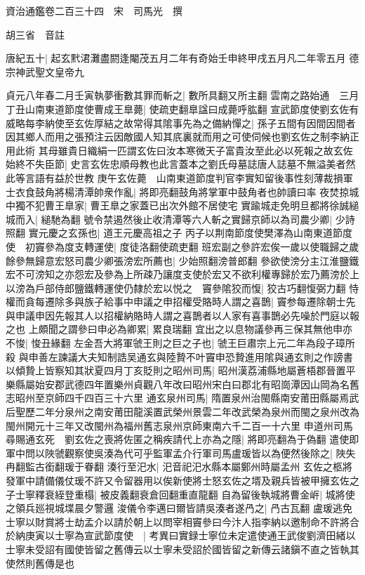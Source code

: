 資治通鑑卷二百三十四　宋　司馬光　撰

胡三省　音註

唐紀五十|{
	起玄黓涒灘盡閼逢閹茂五月二年有奇始壬申終甲戌五月凡二年零五月}
德宗神武聖文皇帝九

貞元八年春二月壬寅執夢衝數其罪而斬之|{
	數所具翻又所主翻}
雲南之路始通　三月丁丑山南東道節度使曹成王臯薨|{
	使疏吏翻臯諡曰成薨呼肱翻}
宣武節度使劉玄佐有威略每李納使至玄佐厚結之故常得其隂事先為之備納憚之|{
	孫子五間有因間因間者因其鄉人而用之張預注云因敵國人知其㡳裏就而用之可使伺候也劉玄佐之制李納正用此術}
其母雖貴日織絹一匹謂玄佐曰汝本寒微天子富貴汝至此必以死報之故玄佐始終不失臣節|{
	史言玄佐忠順母教也此言蓋本之劉氏母墓誌唐人誌墓不無溢美者然此等言語有益於世教}
庚午玄佐薨　山南東道節度判官李實知留後事性刻薄裁損軍士衣食鼓角將楊清潭帥衆作亂|{
	將即亮翻鼓角將掌軍中鼓角者也帥讀曰率}
夜焚掠城中獨不犯曹王臯家|{
	曹王臯之家蓋已出次外館不居使宅}
實踰城走免明旦都將徐誠縋城而入|{
	縋馳為翻}
號令禁遏然後止收清潭等六人斬之實歸京師以為司農少卿|{
	少詩照翻}
實元慶之玄孫也|{
	道王元慶高祖之子}
丙子以荆南節度使樊澤為山南東道節度使　初竇參為度支轉運使|{
	度徒洛翻使疏吏翻}
班宏副之參許宏俟一歲以使職歸之歲餘參無歸意宏怒司農少卿張滂宏所薦也|{
	少始照翻滂普郎翻}
參欲使滂分主江淮鹽鐵宏不可滂知之亦怨宏及參為上所疎乃讓度支使於宏又不欲利權專歸於宏乃薦滂於上以滂為戶部侍郎鹽鐵轉運使仍隸於宏以悦之　竇參隂狡而愎|{
	狡古巧翻愎弼力翻}
恃權而貪每遷除多與族子給事中申議之申招權受賂時人謂之喜鵲|{
	竇参每遷除朝士先與申議申因先報其人以招權納賂時人謂之喜鵲者以人家有喜事鵲必先噪於門庭以報之也}
上頗聞之謂參曰申必為卿累|{
	累良瑞翻}
宜出之以息物議參再三保其無他申亦不悛|{
	悛丑緣翻}
左金吾大將軍虢王則之巨之子也|{
	虢王巨肅宗上元二年為段子璋所殺}
與申善左諫議大夫知制誥吴通玄與陸贄不叶竇申恐贄進用隂與通玄則之作謗書以傾贄上皆察知其狀夏四月丁亥貶則之昭州司馬|{
	昭州漢荔浦縣地屬蒼梧郡晉置平樂縣屬始安郡武德四年置樂州貞觀八年改曰昭州宋白曰郡北有昭崗潭因山岡為名舊志昭州至京師四千四百三十六里}
通玄泉州司馬|{
	隋置泉州治閩縣南安莆田縣屬焉武后聖歷二年分泉州之南安莆田龍溪置武榮州景雲二年改武榮為泉州而閩之泉州改為閩州開元十三年又改閩州為福州舊志泉州京師東南六千二百一十六里}
申道州司馬尋賜通玄死　劉玄佐之喪將佐匿之稱疾請代上亦為之隱|{
	將即亮翻為于偽翻}
遣使即軍中問以陜虢觀察使吳湊為代可乎監軍孟介行軍司馬盧瑗皆以為便然後除之|{
	陜失冉翻監古銜翻瑗于眷翻}
湊行至汜水|{
	汜音祀汜水縣本屬鄭州時屬孟州}
玄佐之柩將發軍中請備儀仗瑗不許又令留器用以俟新使將士怒玄佐之壻及親兵皆被甲擁玄佐之子士寧釋衰絰登重榻|{
	被皮義翻衰倉回翻重直龍翻}
自為留後執城將曹金㟁|{
	城將使之領兵廵視城堞晨夕警邏}
浚儀令李邁曰爾皆請吳湊者遂冎之|{
	冎古瓦翻}
盧瑗逃免士寧以財賞將士劫孟介以請於朝上以問宰相竇參曰今汴人指李納以邀制命不許將合於納庚寅以士寧為宣武節度使　|{
	考異曰實録士寧位未定遣使通王武俊劉濟田緒以士寧未受詔有國使皆留之舊傳云以士寧未受詔於國皆留之新傳云諸鎭不直之皆執其使然則舊傳是也}
